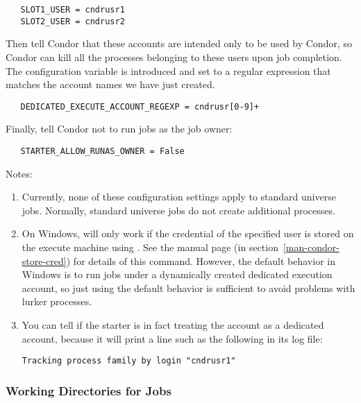 \begin{verbatim}
   SLOT1_USER = cndrusr1
   SLOT2_USER = cndrusr2
\end{verbatim}

Then tell Condor that these accounts are intended only to be used by Condor,
so Condor can kill all the processes belonging to these users upon
job completion.
The configuration variable 
is introduced and set to a regular expression that matches the account
names we have just created.

\begin{verbatim}
   DEDICATED_EXECUTE_ACCOUNT_REGEXP = cndrusr[0-9]+
\end{verbatim}

Finally, tell Condor not to run jobs as the job owner:

\begin{verbatim}
   STARTER_ALLOW_RUNAS_OWNER = False
\end{verbatim}

Notes:
\begin{enumerate}

\item{ Currently, none of these configuration settings apply to
standard universe jobs.  Normally, standard universe jobs do not
create additional processes. }

\item{
On Windows,  will only work if the credential
of the specified user is stored on the execute machine
using .
See the 
manual page (in section~\ref{man-condor-store-cred})
for details of this command.  However, the default behavior in Windows
is to run jobs under a dynamically created dedicated execution account,
so just using the default behavior is sufficient to avoid problems
with lurker processes.
}
\item {
You can tell if the starter is in fact treating the account as a
dedicated account, because it will print a line such as the following
in its log file:

\begin{verbatim}
Tracking process family by login "cndrusr1"
\end{verbatim}
}
\end{enumerate}


\subsubsection{\label{sec:DirOfJob}Working Directories for Jobs}

